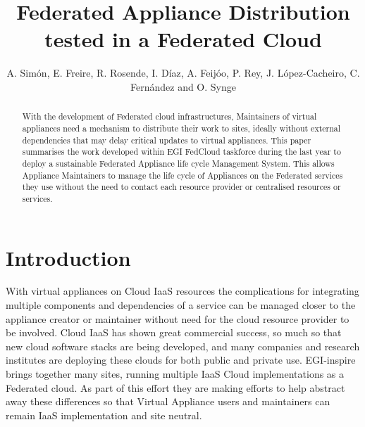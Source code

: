\documentclass{llncs_Ibergrid2013}
\begin{document}
%
\frontmatter          %
%
\pagestyle{headings}  %
%
\mainmatter              %
%
\title{Federated Appliance Distribution tested in a Federated Cloud}
%
%
\author{A. Sim\'on, E. Freire, R. Rosende, I. D\'iaz, A. Feij\'oo, P. Rey, J. L\'opez-Cacheiro, C. Fern\'andez and O. Synge}
%
%
%




\maketitle              %

\begin{abstract}
With the development of Federated cloud infrastructures, Maintainers of virtual appliances need a mechanism to distribute their work to sites, ideally without external dependencies that may delay critical updates to virtual appliances. This paper summarises the work developed within EGI FedCloud taskforce during the last year to deploy a sustainable Federated Appliance life cycle Management System. This allows Appliance Maintainers to manage the life cycle of Appliances on the Federated services they use without the need to contact each resource provider or centralised resources or services.
\end{abstract}

%
\section{Introduction}
\label{sect-introduction}
%
With virtual appliances on Cloud IaaS resources the complications for integrating multiple components and dependencies of a service can be managed closer to the appliance creator or maintainer without need for the cloud resource provider to be involved. Cloud IaaS has shown great commercial success, so much so that new cloud software stacks are being developed, and many companies and research institutes are deploying these clouds for both public and private use. EGI-inspire brings together many sites, running multiple IaaS Cloud implementations as a Federated cloud. As part of this effort they are making efforts to help abstract away these differences so that Virtual Appliance users and maintainers can remain IaaS implementation and site neutral.
\end{document}
